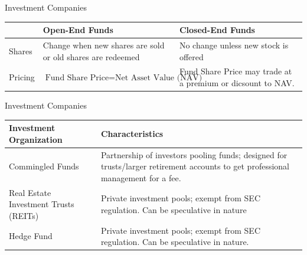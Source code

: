 \documentclass{beamer}
\renewcommand{\arraystretch}{1.5}
\begin{document}
\begin{frame}{Investment Companies}
\begin{center}
\renewcommand{\arraystretch}{1.5}
\begin{tabular}{l|p{1.5in}|p{1.5in}}
& \textbf{Open-End Funds} & \textbf{Closed-End Funds} \\ \hline
Shares & Change when new shares are sold or old shares are redeemed & No change unless new stock is offered \\ \hline
Pricing & $\text{Fund Share Price}=\text{Net Asset Value (NAV)}$ & Fund Share Price may trade at a premium or dicsount to NAV.
\end{tabular}
\end{center}
\end{frame}

\begin{frame}{Investment Companies}
\begin{center}
\renewcommand{\arraystretch}{1.5}
\begin{tabular}{p{2in}|p{2in}}
\textbf{Investment Organization} & \textbf{Characteristics} \\ \hline
Commingled Funds & Partnership of investors pooling funds; designed for trusts/larger retirement accounts to get professional management for a fee. \\ \hline
Real Estate Investment Trusts (REITs) & Private investment pools; exempt from SEC regulation.  Can be speculative in nature \\ \hline
Hedge Fund & Private investment pools; exempt from SEC regulation.  Can be speculative in nature.
\end{tabular}
\end{center}
\end{frame}
\end{document}
